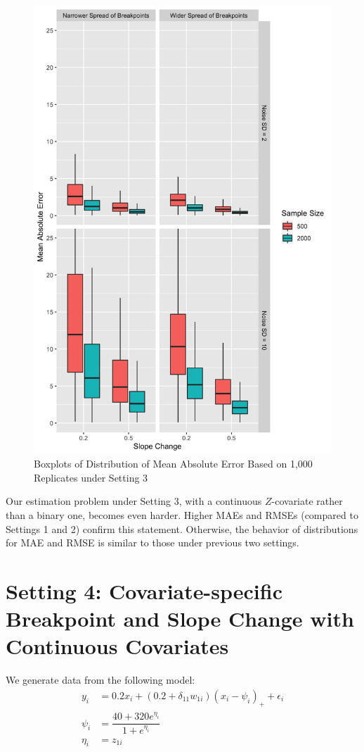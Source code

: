\documentclass [12pt, proquest] {uwthesis}[2016/11/22]
\begin{document}
\begin{figure}
    \centering
    \includegraphics[width = 5.5 in]{Plot4_3.png}
    \caption{Boxplots of Distribution of Mean Absolute Error Based on 1,000 Replicates under Setting 3}
\end{figure}

Our estimation problem under Setting 3, with a continuous $Z$-covariate rather than a binary one, becomes even harder. Higher MAEs and RMSEs (compared to Settings 1 and 2) confirm this statement. Otherwise, the behavior of distributions for MAE and RMSE is similar to those under previous two settings.

\section{Setting 4: Covariate-specific Breakpoint and Slope Change with Continuous Covariates}
We generate data from the following model:
\begin{align*}
   y_i &= 0.2 x_i + (0.2 + \delta_{11} w_{1i}) (x_i - \psi_i)_+ + \epsilon_i \\
    \psi_i &= \dfrac{40 + 320 e^{\eta_i}}{1 + e^{\eta_i}} \\
    \eta_i &= z_{1i}
\end{align*}
\end{document}
